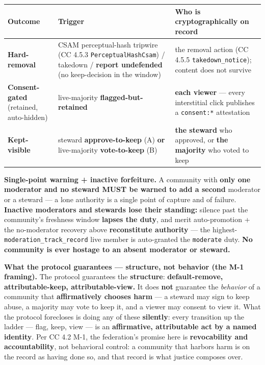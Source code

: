 \documentclass[11pt]{article}
\begin{document}
{\footnotesize
\begin{longtable}{|p{5.33cm}|p{5.33cm}|p{5.33cm}|}\hline
\textbf{Outcome} & \textbf{Trigger} & \textbf{Who is cryptographically on record} \\ \hline\endhead
\textbf{Hard-removal} & CSAM perceptual-hash tripwire (CC 4.5.3 \texttt{PerceptualHashCsam}) / takedown / \textbf{report undefended} (no keep-decision in the window) & the removal action (CC 4.5.5 \texttt{takedown\_notice}); content does not survive \\ \hline
\textbf{Consent-gated} (retained, auto-hidden) & live-majority \textbf{flagged-but-retained} & \textbf{each viewer} — every interstitial click publishes a \texttt{consent:*} attestation \\ \hline
\textbf{Kept-visible} & steward \textbf{approve-to-keep} (A) \textbf{or} live-majority \textbf{vote-to-keep} (B) & \textbf{the steward} who approved, or \textbf{the majority} who voted to keep \\ \hline
\end{longtable}}


\textbf{Single-point warning + inactive forfeiture.} A community with \textbf{only one moderator and no steward MUST be warned to add a second} moderator or a steward — a lone authority is a single point of capture and of failure. \textbf{Inactive moderators and stewards lose their standing:} silence past the community's freshness window \textbf{lapses the duty}, and merit auto-promotion + the no-moderator recovery above \textbf{reconstitute authority} — the highest-\texttt{moderation\_track\_record} live member is auto-granted the \texttt{moderate} duty. \textbf{No community is ever hostage to an absent moderator or steward.}


\textbf{What the protocol guarantees — structure, not behavior (the M-1 framing).} The protocol guarantees the \textbf{structure}: \textbf{default-remove, attributable-keep, attributable-view.} It does \textbf{not} guarantee the \textit{behavior} of a community that \textbf{affirmatively chooses harm} — a steward may sign to keep abuse, a majority may vote to keep it, and a viewer may consent to view it. What the protocol forecloses is doing any of these \textbf{silently}: every transition up the ladder — flag, keep, view — is an \textbf{affirmative, attributable act by a named identity}. Per CC 4.2 M-1, the federation's promise here is \textbf{revocability and accountability}, not behavioral control: a community that harbors harm is on the record as having done so, and that record is what justice composes over.
\end{document}

